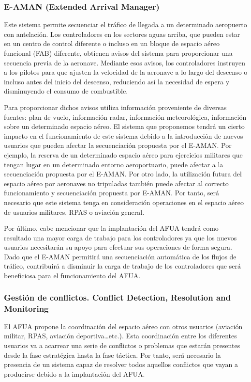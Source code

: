 \subsubsection{E-AMAN (Extended Arrival Manager)}

Este sistema permite secuenciar el tráfico de llegada a un determinado aeropuerto con antelación. Los controladores en los sectores aguas arriba, que pueden estar en un centro de control diferente o incluso en un bloque de espacio aéreo funcional (FAB) diferente, obtienen avisos del sistema para proporcionar una secuencia previa de la aeronave. Mediante esos avisos, los controladores instruyen a los pilotos para que ajusten la velocidad de la aeronave a lo largo del descenso o incluso antes del inicio del descenso, reduciendo así la necesidad de espera y disminuyendo el consumo de combustible. 

Para proporcionar dichos avisos utiliza información proveniente de diversas fuentes: plan de vuelo, información radar, información meteorológica, información sobre un determinado espacio aéreo. 
El sistema que proponemos tendrá un cierto impacto en el funcionamiento de este sistema debido a la introducción de nuevos usuarios que pueden afectar la secuenciación propuesta por el E-AMAN. Por ejemplo, la reserva de un determinado espacio aéreo para ejercicios militares que tengan lugar en un determinado entorno aeroportuario, puede afectar a la secuenciación propuesta por el E-AMAN. Por otro lado, la utilización futura del espacio aéreo por aeronaves no tripuladas también puede afectar al correcto funcionamiento y secuenciación propuesta por E-AMAN. Por tanto, será necesario que este sistema tenga en consideración operaciones en el espacio aéreo de usuarios militares, RPAS o aviación general.

Por último, cabe mencionar que la implantación del AFUA tendrá como resultado una mayor carga de trabajo para los controladores ya que los nuevos usuarios necesitarán su apoyo para efectuar sus operaciones de forma segura. Dado que el E-AMAN permitirá una secuenciación automática de los flujos de tráfico, contribuirá a disminuir la carga de trabajo de los controladores que será beneficiosa para el funcionamiento del AFUA.

\subsubsection{Gestión de conflictos. Conflict Detection, Resolution and Monitoring}

El AFUA propone la coordinación del espacio aéreo con otros usuarios (aviación militar, RPAS, aviación deportiva…etc.). Esta coordinación entre los diferentes usuarios va a acarrear una serie de conflictos o problemas que estarán presentes desde la fase estratégica hasta la fase táctica. Por tanto, será necesario la presencia de un sistema capaz de resolver todos aquellos conflictos que vayan a producirse debido a la implantación del AFUA. 

